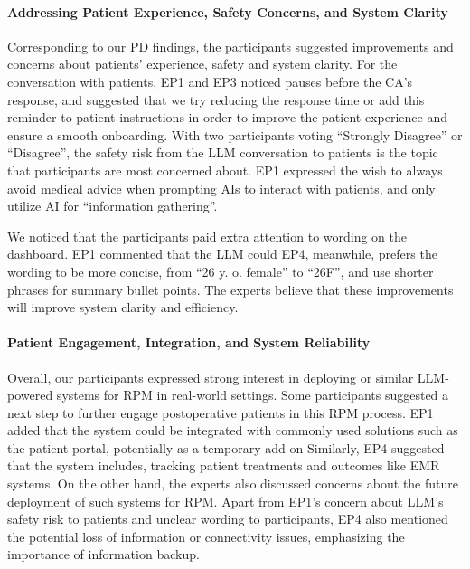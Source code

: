 \paragraph{Addressing Patient Experience, Safety Concerns, and System Clarity
}
Corresponding to our PD findings, the participants suggested improvements and concerns about patients' experience, safety and system clarity.
For the conversation with patients, EP1 and EP3 noticed pauses before the CA's response, and suggested that we try reducing the response time or add this reminder to patient instructions in order to improve the patient experience and ensure a smooth onboarding. With two participants voting ``Strongly Disagree'' or ``Disagree'', the safety risk from the LLM conversation to patients is the topic that participants are most concerned about. EP1 expressed the wish to always avoid medical advice when prompting AIs to interact with patients, and only utilize AI for ``information gathering''.

We noticed that the participants paid extra attention to wording on the dashboard. EP1 commented that the LLM could
 EP4, meanwhile, prefers the wording to be more concise, \eg from ``26 y. o. female'' to ``26F'', and use shorter phrases for summary bullet points. The experts believe that these improvements will improve system clarity and efficiency.



\paragraph{Patient Engagement, Integration, and System Reliability}
Overall, our participants expressed strong interest in deploying \projectname{} or similar LLM-powered systems for RPM in real-world settings.
Some participants suggested a next step to further engage postoperative patients in this RPM process.  
EP1 added that the system could be integrated with commonly used solutions such as the patient portal, potentially as a temporary add-on 
Similarly, EP4 suggested that the system includes, tracking patient treatments and outcomes like EMR systems.
On the other hand, the experts also discussed concerns about the future deployment of such systems for RPM. Apart from EP1's concern about LLM's safety risk to patients and unclear wording to participants, EP4 also mentioned the potential loss of information or connectivity issues, emphasizing the importance of information backup.

